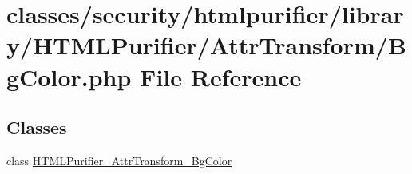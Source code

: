\hypertarget{BgColor_8php}{\section{classes/security/htmlpurifier/library/\+H\+T\+M\+L\+Purifier/\+Attr\+Transform/\+Bg\+Color.php File Reference}
\label{BgColor_8php}
}
\subsection*{Classes}
\begin{DoxyCompactItemize}
\item 
class \hyperlink{classHTMLPurifier__AttrTransform__BgColor}{H\+T\+M\+L\+Purifier\+\_\+\+Attr\+Transform\+\_\+\+Bg\+Color}
\end{DoxyCompactItemize}
